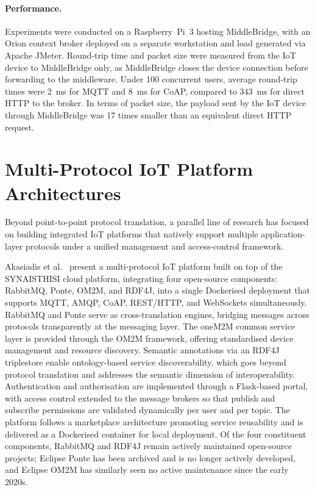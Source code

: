 \paragraph{Performance.}
Experiments were conducted on a Raspberry~Pi~3 hosting MiddleBridge, with an Orion context broker deployed on a separate workstation and load generated via Apache JMeter. Round-trip time and packet size were measured from the IoT device to MiddleBridge only, as MiddleBridge closes the device connection before forwarding to the middleware. Under 100 concurrent users, average round-trip times were 2~ms for MQTT and 8~ms for CoAP, compared to 343~ms for direct HTTP to the broker. In terms of packet size, the payload sent by the IoT device through MiddleBridge was 17 times smaller than an equivalent direct HTTP request.

\section{Multi-Protocol IoT Platform Architectures}
\label{sec:soa_multiprotocol_platforms}

Beyond point-to-point protocol translation, a parallel line of research has focused on building integrated IoT platforms that natively support multiple application-layer protocols under a unified management and access-control framework.

Akasiadis et al.~\cite{akasiadis2019} present a multi-protocol IoT platform built on top of the SYNAISTHISI cloud platform, integrating four open-source components: RabbitMQ, Ponte, OM2M, and RDF4J, into a single Dockerised deployment that supports MQTT, AMQP, CoAP, REST/HTTP, and WebSockets simultaneously. RabbitMQ and Ponte serve as cross-translation engines, bridging messages across protocols transparently at the messaging layer. The oneM2M common service layer is provided through the OM2M framework, offering standardised device management and resource discovery. Semantic annotations via an RDF4J triplestore enable ontology-based service discoverability, which goes beyond protocol translation and addresses the semantic dimension of interoperability. Authentication and authorisation are implemented through a Flask-based portal, with access control extended to the message brokers so that publish and subscribe permissions are validated dynamically per user and per topic. The platform follows a marketplace architecture promoting service reusability and is delivered as a Dockerised container for local deployment. Of the four constituent components, RabbitMQ and RDF4J remain actively maintained open-source projects; Eclipse Ponte has been archived and is no longer actively developed, and Eclipse OM2M has similarly seen no active maintenance since the early 2020s.

